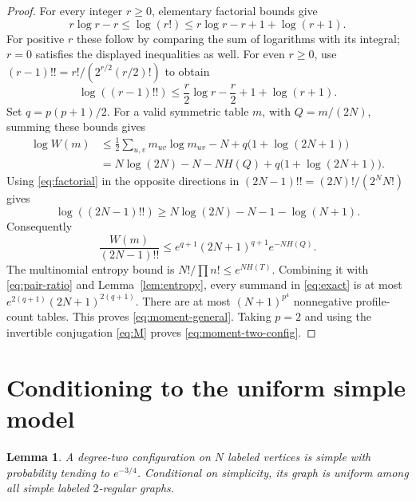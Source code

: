 \documentclass[11pt]{article}
\newtheorem{lemma}[theorem]{Lemma}
\theoremstyle{remark}
\newcommand{\1}{\mathbf 1}
\begin{document}
\begin{proof}
For every integer $r\geq0$, elementary factorial bounds give
\begin{equation}\label{eq:factorial}
 r\log r-r\leq\log(r!)
 \leq r\log r-r+1+\log(r+1).
\end{equation}
For positive $r$ these follow by comparing the sum of logarithms with
its integral; $r=0$ satisfies the displayed inequalities as well.
For even $r\geq0$, use
$(r-1)!!=r!/(2^{r/2}(r/2)!)$ to obtain
\[
 \log((r-1)!!)
 \leq\frac r2\log r-\frac r2+1+\log(r+1).
\]
Set $q=p(p+1)/2$. For a valid symmetric table $m$, with
$Q=m/(2N)$, summing these bounds gives
\begin{align*}
 \log W(m)
 &\leq\frac12\sum_{u,v}m_{uv}\log m_{uv}-N
                         +q\bigl(1+\log(2N+1)\bigr)\\
 &=N\log(2N)-N-NH(Q)+q\bigl(1+\log(2N+1)\bigr).
\end{align*}
Using \eqref{eq:factorial} in the opposite directions in
$(2N-1)!!=(2N)!/(2^NN!)$ gives
\[
 \log((2N-1)!!)
 \geq N\log(2N)-N-1-\log(N+1).
\]
Consequently
\begin{equation}\label{eq:pair-ratio}
 \frac{W(m)}{(2N-1)!!}
 \leq e^{q+1}(2N+1)^{q+1}e^{-NH(Q)}.
\end{equation}
The multinomial entropy bound is
$N!/\prod n!\leq e^{NH(T)}$. Combining it with
\eqref{eq:pair-ratio} and Lemma~\ref{lem:entropy}, every summand in
\eqref{eq:exact} is at most
$e^{2(q+1)}(2N+1)^{2(q+1)}$.
There are at most $(N+1)^{p^4}$ nonnegative profile-count tables.
This proves \eqref{eq:moment-general}. Taking $p=2$ and using the
invertible conjugation \eqref{eq:M} proves
\eqref{eq:moment-two-config}.
\end{proof}

\section{Conditioning to the uniform simple model}

\begin{lemma}\label{lem:simple}
A degree-two configuration on $N$ labeled vertices is simple with
probability tending to $e^{-3/4}$. Conditional on simplicity, its graph
is uniform among all simple labeled $2$-regular graphs.
\end{lemma}
\end{document}
